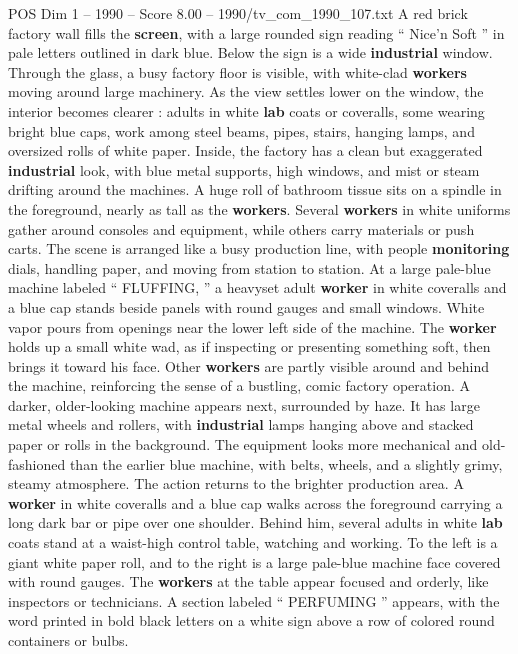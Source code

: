 \begin{textsample}{POS Dim 1 – 1990 – Score 8.00 – 1990/tv\_com\_1990\_107.txt}  \label{ex:f1_pos_050}
A red brick factory wall fills the \textbf{screen}, with a large rounded sign reading “ Nice’n Soft ” in pale letters outlined in dark blue.
Below the sign is a wide \textbf{industrial} window.
Through the glass, a busy factory floor is visible, with white-clad \textbf{workers} moving around large machinery.
As the view settles lower on the window, the interior becomes clearer : adults in white \textbf{lab} coats or coveralls, some wearing bright blue caps, work among steel beams, pipes, stairs, hanging lamps, and oversized rolls of white paper.
Inside, the factory has a clean but exaggerated \textbf{industrial} look, with blue metal supports, high windows, and mist or steam drifting around the machines.
A huge roll of bathroom tissue sits on a spindle in the foreground, nearly as tall as the \textbf{workers}.
Several \textbf{workers} in white uniforms gather around consoles and equipment, while others carry materials or push carts.
The scene is arranged like a busy production line, with people \textbf{monitoring} dials, handling paper, and moving from station to station.
At a large pale-blue machine labeled “ FLUFFING, ” a heavyset adult \textbf{worker} in white coveralls and a blue cap stands beside panels with round gauges and small windows.
White vapor pours from openings near the lower left side of the machine.
The \textbf{worker} holds up a small white wad, as if inspecting or presenting something soft, then brings it toward his face.
Other \textbf{workers} are partly visible around and behind the machine, reinforcing the sense of a bustling, comic factory operation.
A darker, older-looking machine appears next, surrounded by haze.
It has large metal wheels and rollers, with \textbf{industrial} lamps hanging above and stacked paper or rolls in the background.
The equipment looks more mechanical and old-fashioned than the earlier blue machine, with belts, wheels, and a slightly grimy, steamy atmosphere.
The action returns to the brighter production area.
A \textbf{worker} in white coveralls and a blue cap walks across the foreground carrying a long dark bar or pipe over one shoulder.
Behind him, several adults in white \textbf{lab} coats stand at a waist-high control table, watching and working.
To the left is a giant white paper roll, and to the right is a large pale-blue machine face covered with round gauges.
The \textbf{workers} at the table appear focused and orderly, like inspectors or technicians.
A section labeled “ PERFUMING ” appears, with the word printed in bold black letters on a white sign above a row of colored round containers or bulbs.

\end{textsample}
